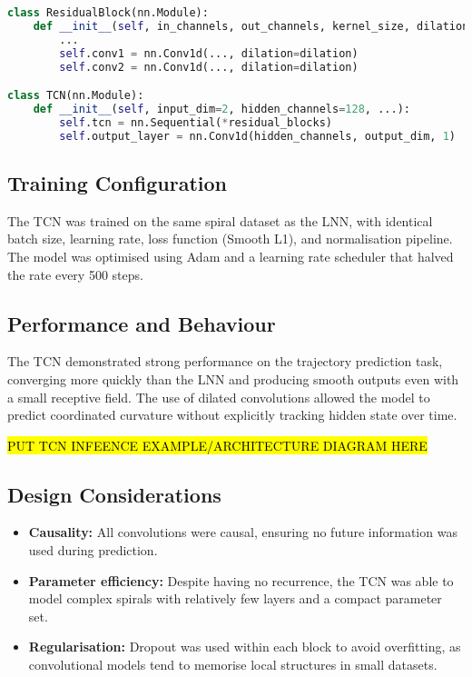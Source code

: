 \begin{lstlisting}[language=Python, caption={Simplified TCN architecture}]
class ResidualBlock(nn.Module):
    def __init__(self, in_channels, out_channels, kernel_size, dilation, dropout):
        ...
        self.conv1 = nn.Conv1d(..., dilation=dilation)
        self.conv2 = nn.Conv1d(..., dilation=dilation)

class TCN(nn.Module):
    def __init__(self, input_dim=2, hidden_channels=128, ...):
        self.tcn = nn.Sequential(*residual_blocks)
        self.output_layer = nn.Conv1d(hidden_channels, output_dim, 1)
\end{lstlisting}

\subsection{Training Configuration}
The TCN was trained on the same spiral dataset as the LNN, with identical batch size, learning rate, loss function (Smooth L1), and normalisation pipeline. The model was optimised using Adam and a learning rate scheduler that halved the rate every 500 steps.

\subsection{Performance and Behaviour}
The TCN demonstrated strong performance on the trajectory prediction task, converging more quickly than the LNN and producing smooth outputs even with a small receptive field. The use of dilated convolutions allowed the model to predict coordinated curvature without explicitly tracking hidden state over time.

\hl{PUT TCN INFEENCE EXAMPLE/ARCHITECTURE DIAGRAM HERE}


\subsection{Design Considerations}
\begin{itemize}
    \item \textbf{Causality:} All convolutions were causal, ensuring no future information was used during prediction.
    \item \textbf{Parameter efficiency:} Despite having no recurrence, the TCN was able to model complex spirals with relatively few layers and a compact parameter set.
    \item \textbf{Regularisation:} Dropout was used within each block to avoid overfitting, as convolutional models tend to memorise local structures in small datasets.
\end{itemize}

